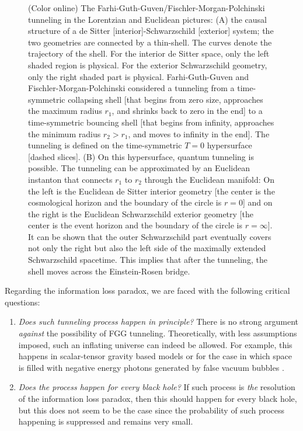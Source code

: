 \documentclass[12pt]{article}
\newcommand{\2}{$^2$}
\newcommand{\3}{$^3$}
\newcommand{\4}{$_4$}
\newcommand{\5}{$_5$}
\begin{document}
\begin{figure}
\begin{center}
\caption{\label{fig:FGG}(Color online) The Farhi-Guth-Guven/Fischler-Morgan-Polchinski tunneling in the Lorentzian and Euclidean pictures:  (A) the causal structure of a de Sitter [interior]-Schwarzschild [exterior] system; the two geometries are connected by a thin-shell. The curves denote the trajectory of the shell. For the interior de Sitter space, only the left shaded region is physical. For the exterior Schwarzschild geometry, only the right shaded part is physical. Farhi-Guth-Guven and Fischler-Morgan-Polchinski considered a tunneling from a time-symmetric collapsing shell [that begins from zero size, approaches the maximum radius $r_{1}$, and shrinks back to zero in the end] to a time-symmetric bouncing shell [that begins from infinity, approaches the minimum radius $r_{2} > r_{1}$, and moves to infinity in the end]. The tunneling is defined on the time-symmetric $T = 0$ hypersurface [dashed slices]. (B) On this hypersurface, quantum tunneling is possible. The tunneling can be approximated by an Euclidean instanton that connects $r_{1}$ to $r_{2}$ through the Euclidean manifold: On the left is the Euclidean de Sitter interior geometry [the center is the cosmological horizon and the boundary of the circle is $r = 0$] and on the right is the Euclidean Schwarzschild exterior geometry [the center is the event horizon and the boundary of the circle is $r =\infty$]. It can be shown that the outer Schwarzschild part eventually covers not only the right but also the left side of the maximally extended Schwarzschild spacetime. This implies that after the tunneling, the shell moves across the Einstein-Rosen bridge.
}
\end{center}
\end{figure}

Regarding the information loss paradox, we are faced with the following critical questions:
\begin{enumerate}
\item \textit{Does such tunneling process happen in principle?} There is no strong argument \emph{against} the possibility of FGG tunneling. Theoretically, with less assumptions imposed, such an inflating universe can indeed be allowed. For example, this happens in scalar-tensor gravity based models \cite{Kim:2010yr,Lee:2010yd} or for the case in which space is filled with negative energy photons  generated by false vacuum bubbles \cite{Yeom:2009mn1, Yeom:2009mn2, Yeom:2009mn3}. 
\item \textit{Does the process happen for every black hole?} If such process is \emph{the}  resolution of the information loss paradox, then this should happen for every black hole, but this does not seem to be the case since the probability of such process happening is suppressed and remains very small. 
\end{enumerate}
\end{document}
